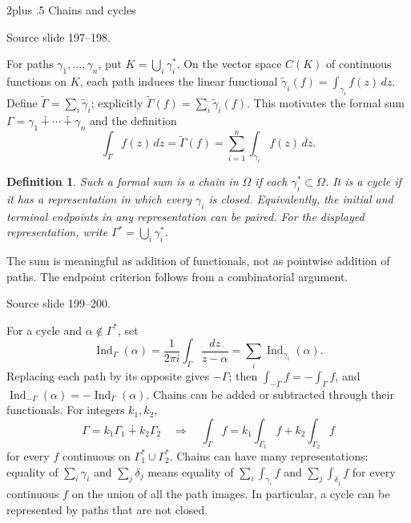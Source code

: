 \documentclass[10pt,letterpaper,twoside,openright]{amsbook}
\makeatletter
\numberwithin{equation}{subsection}
\renewcommand{\section}{\@startsection{section}{1}
 {\z@}{2\baselineskip plus .5\baselineskip}
 {\baselineskip}{\normalfont\Large\bfseries\centering}}
\theoremstyle{sea-plain}
\theoremstyle{sea-definition}
\newtheorem{definition}[subsection]{Definition}
\theoremstyle{sea-exercise}
\DeclareMathOperator{\Ind}{Ind}
\newcommand{\src}[1]{\par\smallskip\noindent
 {\scriptsize\sffamily\color{SoftWhite}Source slide #1.}\par\nopagebreak\smallskip}
\makeatother
\begin{document}
\section{Chains and cycles}
\src{197--198}
For paths $\gamma_1,\ldots,\gamma_n$, put $K=\bigcup_i\gamma_i^*$.
On the vector space $C(K)$ of continuous functions on $K$, each
path induces the linear functional
$\widetilde\gamma_i(f)=\int_{\gamma_i}f(z)\,dz$.
Define $\widetilde\Gamma=\sum_i\widetilde\gamma_i$; explicitly
$\widetilde\Gamma(f)=\sum_i\widetilde\gamma_i(f)$.
This motivates the formal sum $\Gamma=\gamma_1\dotplus\cdots\dotplus\gamma_n$
and the definition
\[
\int_\Gamma f(z)\,dz=\widetilde\Gamma(f)=\sum_{i=1}^n\int_{\gamma_i}f(z)\,dz.
\]
\begin{definition}
Such a formal sum is a \emph{chain} in $\Omega$ if each $\gamma_i^*\subset\Omega$.
It is a \emph{cycle} if it has a representation in which every
$\gamma_i$ is closed. Equivalently, the initial and terminal endpoints
in any representation can be paired. For the displayed representation,
write $\Gamma^*=\bigcup_i\gamma_i^*$.
\end{definition}
The sum is meaningful as addition of functionals, not as pointwise
addition of paths. The endpoint criterion follows from a combinatorial argument.
\src{199--200}
For a cycle and $\alpha\notin\Gamma^*$, set
\[
\Ind_\Gamma(\alpha)=\frac1{2\pi i}\int_\Gamma\frac{dz}{z-\alpha}
=\sum_i\Ind_{\gamma_i}(\alpha).
\]
Replacing each path by its opposite gives $-\Gamma$; then
$\int_{-\Gamma}f=-\int_\Gamma f$, and
$\Ind_{-\Gamma}(\alpha)=-\Ind_\Gamma(\alpha)$.
Chains can be added or subtracted through their functionals.
For integers $k_1,k_2$,
\[
\Gamma=k_1\Gamma_1\dotplus k_2\Gamma_2
\quad\Longrightarrow\quad
\int_\Gamma f=k_1\int_{\Gamma_1}f+k_2\int_{\Gamma_2}f
\]
for every $f$ continuous on $\Gamma_1^*\cup\Gamma_2^*$.
Chains can have many representations: equality of
$\sum_i\gamma_i$ and $\sum_j\delta_j$ means equality of
$\sum_i\int_{\gamma_i}f$ and $\sum_j\int_{\delta_j}f$
for every continuous $f$ on the union of all the path images.
In particular, a cycle can be represented by paths that are not closed.
\end{document}
